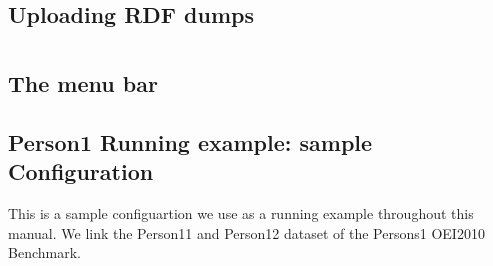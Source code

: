 \documentclass[oneside,a4paper,12pt]{memoir}
\begin{document}
\section{Uploading RDF dumps}
\label{upload}




\newpage
\appendix
\chapter{}
\section{The menu bar}
\label{menuBar}


\section{Person1 Running example: sample Configuration}
\label{person1Spec}
This is a sample configuartion we use as a running example throughout this manual. We link the Person11 and Person12 dataset of the Persons1 OEI2010 Benchmark.\\
\lstset{language=XML}

\end{document}
